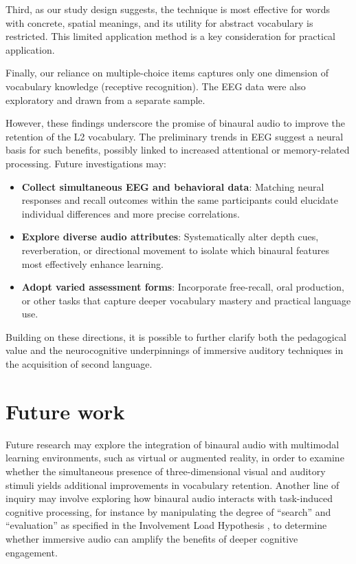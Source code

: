 \documentclass{ehissymp}
\begin{document}
Third, as our study design suggests, the technique is most effective for words with concrete, spatial meanings, and its utility for abstract vocabulary is restricted. This limited application method is a key consideration for practical application.

Finally, our reliance on multiple-choice items captures only one dimension of vocabulary knowledge (receptive recognition). The EEG data were also exploratory and drawn from a separate sample.

However, these findings underscore the promise of binaural audio to improve the retention of the L2 vocabulary. The preliminary trends in EEG suggest a neural basis for such benefits, possibly linked to increased attentional or memory-related processing. Future investigations may:
\begin{itemize}
  \item \textbf{Collect simultaneous EEG and behavioral data}: Matching neural responses and recall outcomes within the same participants could elucidate individual differences and more precise correlations.
  \item \textbf{Explore diverse audio attributes}: Systematically alter depth cues, reverberation, or directional movement to isolate which binaural features most effectively enhance learning.
  \item \textbf{Adopt varied assessment forms}: Incorporate free-recall, oral production, or other tasks that capture deeper vocabulary mastery and practical language use.

\end{itemize}

Building on these directions, it is possible to further clarify both the pedagogical value and the neurocognitive underpinnings of immersive auditory techniques in the acquisition of second language.

\section{Future work}
Future research may explore the integration of binaural audio with multimodal learning environments, such as virtual or augmented reality, in order to examine whether the simultaneous presence of three-dimensional visual and auditory stimuli yields additional improvements in vocabulary retention. Another line of inquiry may involve exploring how binaural audio interacts with task-induced cognitive processing, for instance by manipulating the degree of “search” and “evaluation” as specified in the Involvement Load Hypothesis \cite{hulstijn2001}, to determine whether immersive audio can amplify the benefits of deeper cognitive engagement.
\end{document}

